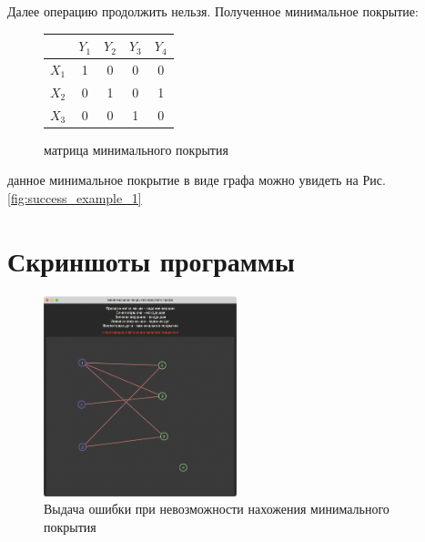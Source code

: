 \documentclass[12pt]{article}
\begin{document}
Далее операцию продолжить нельзя. Полученное минимальное покрытие:

\begin{figure}[H]
    \centering
    \begin{tabular}{ c|c|c|c|c| }
              & $Y_1$ & $Y_2$ & $Y_3$ & $Y_4$ \\
        \hline
        $X_1$ & 1     & 0     & 0     & 0     \\
        \hline
        $X_2$ & 0     & 1     & 0     & 1     \\
        \hline
        $X_3$ & 0     & 0     & 1     & 0     \\
        \hline
    \end{tabular}
    \label{fig:finished_coverage}
    \caption{матрица минимального покрытия}
\end{figure}

данное минимальное покрытие в виде графа можно увидеть на
Рис. \ref{fig:success_example_1}

\section{Скриншоты программы}

\begin{figure}[H]
    \centering
    \includegraphics[width=0.5\textwidth]{screenshot1.png}
    \caption{Выдача ошибки при невозможности
        нахожения минимального покрытия}
    \label{fig:failure_example}
\end{figure}
\end{document}
